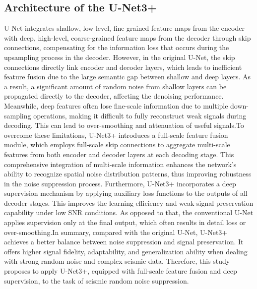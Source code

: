 \documentclass[preprint,12pt]{elsarticle}
\begin{document}
\subsection{Architecture of the U-Net3+}
\label{subsec1}

U-Net integrates shallow, low-level, fine-grained feature maps from the encoder with deep, high-level, coarse-grained feature maps from the decoder through skip connections, compensating for the information loss that occurs during the upsampling process in the decoder. However, in the original U-Net, the skip connections directly link encoder and decoder layers, which leads to inefficient feature fusion due to the large semantic gap between shallow and deep layers. As a result, a significant amount of random noise from shallow layers can be propagated directly to the decoder, affecting the denoising performance. Meanwhile, deep features often lose fine-scale information due to multiple down-sampling operations, making it difficult to fully reconstruct weak signals during decoding. This can lead to over-smoothing and attenuation of useful signals.To overcome these limitations, U-Net3+ introduces a full-scale feature fusion module, which employs full-scale skip connections to aggregate multi-scale features from both encoder and decoder layers at each decoding stage. This comprehensive integration of multi-scale information enhances the network’s ability to recognize spatial noise distribution patterns, thus improving robustness in the noise suppression process. Furthermore, U-Net3+ incorporates a deep supervision mechanism by applying auxiliary loss functions to the outputs of all decoder stages. This improves the learning efficiency and weak-signal preservation capability under low SNR conditions. As opposed to that, the conventional U-Net applies supervision only at the final output, which often results in detail loss or over-smoothing.In summary, compared with the original U-Net, U-Net3+ achieves a better balance between noise suppression and signal preservation. It offers higher signal fidelity, adaptability, and generalization ability when dealing with strong random noise and complex seismic data. Therefore, this study proposes to apply U-Net3+, equipped with full-scale feature fusion and deep supervision, to the task of seismic random noise suppression.
\end{document}
